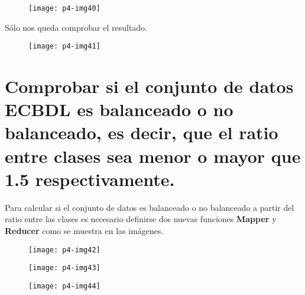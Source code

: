 \documentclass[10pt]{article}
\begin{document}
\begin{figure}[H]
	\begin{center}
 		\texttt{[image: p4-img40]}
	\end{center} 
\end{figure}

Sólo nos queda comprobar el resultado. \\

\begin{figure}[H]
	\begin{center}
 		\texttt{[image: p4-img41]}
	\end{center} 
\end{figure}


\section{Comprobar si el conjunto de datos ECBDL es balanceado o no balanceado, es decir, que el ratio entre clases sea menor o mayor que 1.5 respectivamente.} 
Para calcular si el conjunto de datos es balanceado o no balanceado a partir del ratio entre las clases es necesario definirse dos nuevas funciones \textbf{Mapper} y \textbf{Reducer} como se muestra en las imágenes. \\

\begin{figure}[H]
	\begin{center}
 		\texttt{[image: p4-img42]}
	\end{center} 
\end{figure}

\begin{figure}[H]
	\begin{center}
 		\texttt{[image: p4-img43]}
	\end{center} 
\end{figure}

\begin{figure}[H]
	\begin{center}
 		\texttt{[image: p4-img44]}
	\end{center} 
\end{figure}
\end{document}
